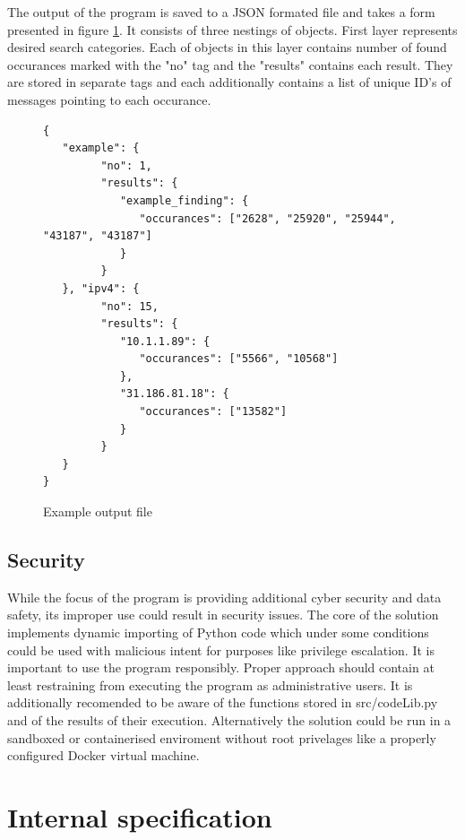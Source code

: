 \documentclass[a4paper,twoside,12pt]{book}
\begin{document}
The output of the program is saved to a JSON formated file and takes a form presented in figure \ref{fig:outputFile}. 
It consists of three nestings of objects. First layer represents desired search categories. Each of objects in
this layer contains number of found occurances marked with the "no" tag and the "results" contains each
result. They are stored in separate tags and each additionally contains a list of unique ID's of messages 
pointing to each occurance.  

\begin{figure}
\centering
\begin{lstlisting}
{
   "example": {
         "no": 1, 
         "results": {
            "example_finding": {
               "occurances": ["2628", "25920", "25944", "43187", "43187"]
            }
         }   
   }, "ipv4": {
         "no": 15, 
         "results": {
            "10.1.1.89": {
               "occurances": ["5566", "10568"]
            }, 
            "31.186.81.18": {
               "occurances": ["13582"]
            }
         }
   }
}
\end{lstlisting}
\caption{Example output file}
\label{fig:outputFile}
\end{figure}

\section{Security}

While the focus of the program is providing additional cyber security and data safety, its 
improper use could result in security issues. The core of the solution implements
dynamic importing of Python code which under some conditions could be used with malicious
intent for purposes like privilege escalation. It is important to use the program 
responsibly. Proper approach should contain at least restraining from executing
the program as administrative users. It is additionally recomended to be aware of the 
functions stored in src/codeLib.py and of the results of their execution. Alternatively the solution could be run in a sandboxed or containerised
enviroment without root privelages like a properly configured Docker virtual machine.

\chapter{Internal specification}
\end{document}

